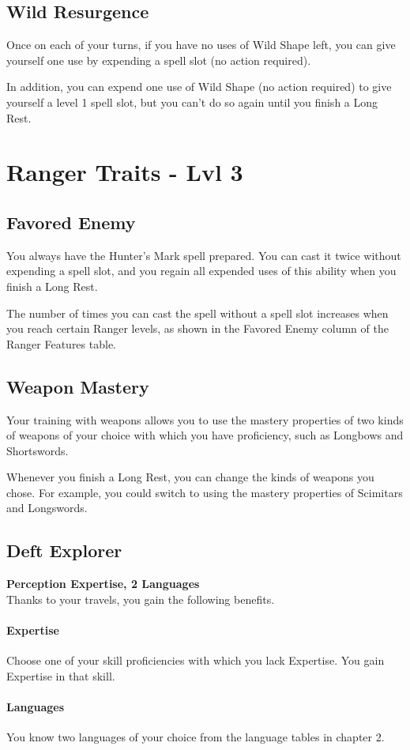 \documentclass[letterpaper,openany,oneside,twocolumn]{book}
\begin{document}
\subsection*{Wild Resurgence}
Once on each of your turns, if you have no uses of Wild Shape left, you can give yourself one use by expending a spell slot (no action required).

In addition, you can expend one use of Wild Shape (no action required) to give yourself a level 1 spell slot, but you can't do so again until you finish a Long Rest.
\vfill\eject
\section*{Ranger Traits - Lvl 3}	%
\subsection*{Favored Enemy}
You always have the Hunter's Mark spell prepared. You can cast it twice without expending a spell slot, and you regain all expended uses of this ability when you finish a Long Rest.

The number of times you can cast the spell without a spell slot increases when you reach certain Ranger levels, as shown in the Favored Enemy column of the Ranger Features table.
\subsection*{Weapon Mastery}
Your training with weapons allows you to use the mastery properties of two kinds of weapons of your choice with which you have proficiency, such as Longbows and Shortswords.

Whenever you finish a Long Rest, you can change the kinds of weapons you chose. For example, you could switch to using the mastery properties of Scimitars and Longswords.
\subsection*{Deft Explorer}
\textbf{Perception Expertise, 2 Languages}\\
Thanks to your travels, you gain the following benefits.
\paragraph*{Expertise} Choose one of your skill proficiencies with which you lack Expertise. You gain Expertise in that skill.
\paragraph*{Languages} You know two languages of your choice from the language tables in chapter 2.
\end{document}
